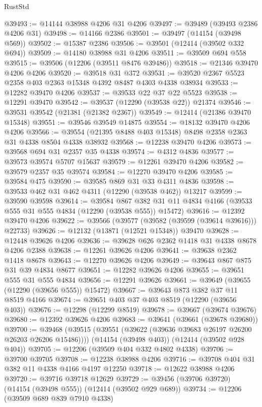 \begin{lexlean}{RustStd}
\begin{coremodule}
{\begin{coremodule}
{{{{{{{{{{{{{{{{{{{{{{{{{{{{{{{{{{{{{{{{{{{{{{{{{{@39493 := @14144 @38988 @4206 @31 @4206
@39497 := @39489 (@39493 @2386 @4206 @31)
@39498 := @14166 @2386
@39501 := @39497 (@14154 (@39498 @569))
@39502 := @15387 @2386
@39506 := @39501 (@12414 (@39502 @332 @694))
@39509 := @14180 @38988 @31 @4206
@39511 := @39509 @694 @558
@39515 := @39506 (@12206 (@39511 @8476 @39486))
@39518 := @21346 @39470 @4206 @4206
@39520 := @39518 @31 @372
@39531 := @39520 @2367 @5523 @2358 @403 @2363 @15348 @4392 @8487 @4303 @4338 @38934
@39533 := @12282 @39470 @4206
@39537 := @39533 @22 @37 @22 @5523
@39538 := @12291 @39470
@39542 := @39537 (@12290 (@39538 @22)) @21374
@39546 := @39531 @39542 (@21381 (@21382 @2367))
@39549 := @12414 (@21386 @39470 @15348)
@39551 := @39546 @39549 @14875
@39554 := @18132 @39470 @4206 @4206
@39566 := @39554 (@21395 @8488 @403 @15348) @8498 @2358 @2363 @31 @4338 @8504 @4338 @38932
@39568 := @12238 @39470 @4206
@39573 := @39568 @694 @31 @2357 @35 @4338
@39574 := @4312 @4836
@39577 := @39573 @39574 @5707 @15637
@39579 := @12261 @39470 @4206
@39582 := @39579 @2357 @35 @39574
@39584 := @12270 @39470 @4206
@39585 := @39584 @475
@39590 := @39585 @869 @31 @33 @4311 @4836
@39598 := @39533 @462 @31 @462 @4311 (@12290 (@39538 @462)) @13217
@39599 := @39590 @39598
@39614 := @39584
    @867
    @382
    @31
    @11
    @4834
    @4166
    (@39533 @555 @31 @555 @4834 (@12290 (@39538 @555)) @15472)
@39616 := @12392 @39470 @4206
@39622 := @39566 (@39577 (@39582 (@39599 (@39614 @39616))) @22733)
@39626 := @12132 (@13871 (@12521 @15348)) @39470
@39628 := @12448 @39626 @4206
@39636 := @39628 @626 @2362 @1418 @31 @4338 @8678 @4206 @2388
@39638 := @12261 @39626 @4206
@39641 := @39638 @2362 @1418 @8678
@39643 := @12270 @39626 @4206
@39649 := @39643 @867 @875 @31 @39 @4834 @8677
@39651 := @12282 @39626 @4206
@39655 := @39651 @555 @31 @555 @4834
@39656 := @12291 @39626
@39661 := @39649 (@39655 (@12290 (@39656 @555)) @15472)
@39667 := @39643 @873 @382 @37 @11 @8519 @4166
@39674 := @39651 @403 @37 @403 @8519 (@12290 (@39656 @403))
@39676 := @12298 (@12299 @8519)
@39678 := @39667 (@39674 @39676)
@39680 := @12392 @39626 @4206
@39683 := @39641 (@39661 (@39678 @39680))
@39700 := @39468
    (@39515 (@39551 (@39622 (@39636 @39683 @26197 @26200 @26203 @26206 @15486))))
    (@14154 (@39498 @403))
    (@12414 (@39502 @928 @404))
@39705 := @12206 (@39509 @404 @332 @4802 @4338)
@39706 := @39700 @39705
@39708 := @12238 @38988 @4206
@39716 := @39708 @404 @31 @382 @11 @4338 @4166 @4197 @12250
@39718 := @12622 @38988 @4206
@39720 := @39716 @39718 @12629
@39729 := @39456 (@39706 @39720) (@14154 (@39498 @555)) (@12414 (@39502 @929 @689))
@39734 := @12206 (@39509 @689 @839 @7910 @4338)
}}}}}}}}}}}}}}}}}}}}}}}}}}}}}}}}}}}}}}}}}}}}}}}}}}
\end{coremodule}}
\end{coremodule}
\end{lexlean}
